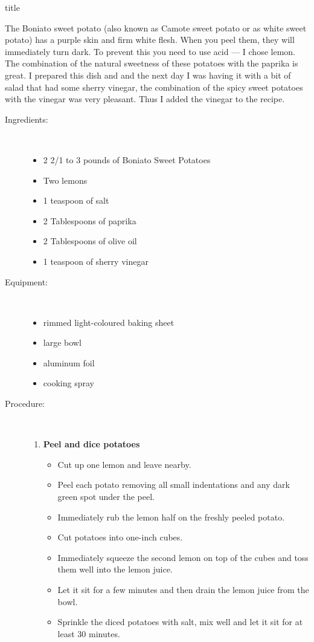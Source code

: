 \documentclass [11pt, letterpaper] {article}
\begin{document}
 {title}


The Boniato sweet potato (also known as Camote sweet potato or as white sweet potato) has a purple skin and firm white flesh. When you peel them, they will immediately turn dark. To prevent this you need to use acid --- I chose lemon. The combination of the natural sweetness of these potatoes with the paprika is great. I prepared this dish and and the next day I was having it with a bit of salad that had some sherry vinegar, the combination of the spicy sweet potatoes with the vinegar was very pleasant. Thus I added the vinegar to the recipe. 


\begin{description}

\item[Ingredients:]\ \\
	\begin{itemize}
	\item 2 2/1 to 3 pounds of Boniato Sweet Potatoes
	\item Two lemons
	\item 1 teaspoon of salt
	\item 2 Tablespoons of paprika
	\item 2 Tablespoons of olive oil
	\item 1 teaspoon of sherry vinegar
	\end{itemize}

\item[Equipment:]\ \\
	\begin{itemize}
	\item rimmed light-coloured baking sheet
	\item large bowl
	\item aluminum foil
        \item cooking spray
	\end{itemize}
\item[Procedure:]\ \\

	\begin{enumerate}
	\item {\bf Peel and dice potatoes}
	\begin{itemize}
	\item Cut up one lemon and leave nearby.
        \item Peel each potato removing all small indentations and any dark green spot under the peel. 
	\item Immediately rub the lemon half on the freshly peeled potato.
        \item Cut potatoes into one-inch cubes.
        \item Immediately squeeze the second lemon on top of the cubes and toss them well into the lemon juice. 
        \item Let it sit for a few minutes and then drain the lemon juice from the bowl.
        \item Sprinkle the diced potatoes with salt, mix well and let it sit for at least 30 minutes.
	\end{itemize}
	

\end{enumerate}
\end{description}
\end{document}
